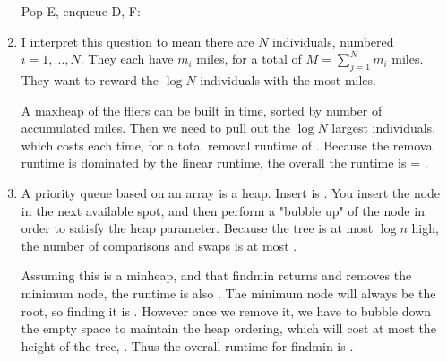 \documentclass[12pt]{chmullighw}
\begin{document}
\begin{enumerate}
Pop E, enqueue D, F: \\

\item I interpret this question to mean there are $N$ individuals, numbered
$ i = 1, \ldots, N$. They each have $m_i$ miles, for a total of
$M = \sum_{j=1}^{N}m_i$ miles. They want to reward the $\log N$ individuals 
with the most miles.

A maxheap of the fliers can be built in  time, sorted by number of accumulated miles. Then we need to pull out the $\log N$ largest individuals, which costs  each time, for a total removal runtime of . Because the removal runtime is dominated by the linear runtime, the overall the runtime is  = .


\item A priority queue based on an array is a heap. Insert is . You insert the node in the next available spot, and then perform a "bubble up" of the node in order to satisfy the heap parameter. Because the tree is at most $\log n$ high, the number of comparisons and swaps is at most .

Assuming this is a minheap, and that findmin returns and removes the minimum node, the runtime is also . The minimum node will always be the root, so finding it is . However once we remove it, we have to bubble down the empty space to maintain the heap ordering, which will cost at most the height of the tree, . Thus the overall runtime for findmin is .



\end{enumerate}
\end{document}
